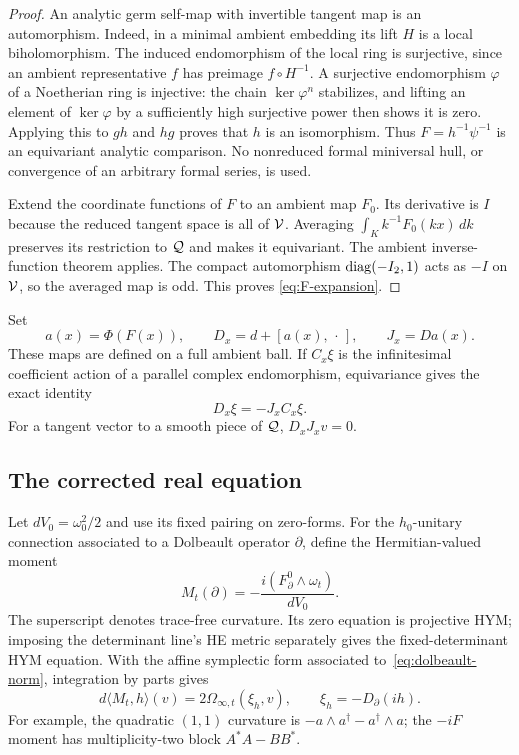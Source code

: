 \begin{proof}
An analytic germ self-map with invertible tangent map is an automorphism.
Indeed, in a minimal ambient embedding its lift $H$ is a local
biholomorphism. The induced endomorphism of the local ring is
surjective, since an ambient representative $f$ has preimage
$f\circ H^{-1}$. A surjective endomorphism $\varphi$ of a Noetherian
ring is injective: the chain $\ker\varphi^n$ stabilizes, and lifting
an element of $\ker\varphi$ by a sufficiently high surjective power
then shows it is zero. Applying this to $gh$ and $hg$ proves that
$h$ is an isomorphism. Thus $F=h^{-1}\psi^{-1}$ is an equivariant
analytic comparison. No nonreduced formal miniversal hull, or
convergence of an arbitrary formal series, is used.

Extend the coordinate functions of $F$ to an ambient map $F_0$.
Its derivative is $I$ because the reduced tangent space is all of
$\mathcal V$. Averaging $\int_K k^{-1}F_0(kx)\,dk$ preserves its restriction
to $\mathcal Q$ and makes it equivariant. The ambient inverse-function
theorem applies. The compact automorphism $\operatorname{diag}(-I_2,1)$ acts as
$-I$ on $\mathcal V$, so the averaged map is odd. This proves
\eqref{eq:F-expansion}.
\end{proof}

Set
\begin{equation}\label{eq:reconstruction}
a(x)=\Phi(F(x)),\qquad D_x=d+[a(x),\,\cdot\,],\qquad J_x=Da(x).
\end{equation}
These maps are defined on a full ambient ball. If $C_x\xi$ is the
infinitesimal coefficient action of a parallel complex endomorphism,
equivariance gives the exact identity
\begin{equation}\label{eq:equivariance}
D_x\xi=-J_xC_x\xi.
\end{equation}
For a tangent vector to a smooth piece of $\mathcal Q$, $D_xJ_xv=0$.

\subsection{The corrected real equation}

Let $dV_0=\omega_0^2/2$ and use its fixed pairing on zero-forms.
For the $h_0$-unitary connection associated to a Dolbeault operator
$\partial$, define the Hermitian-valued moment
\begin{equation}\label{eq:infinite-moment}
M_t(\partial)=-\frac{i(F_\partial^0\wedge\omega_t)}{dV_0}.
\end{equation}
The superscript denotes trace-free curvature. Its zero equation is
projective HYM; imposing the determinant line's HE metric separately
gives the fixed-determinant HYM equation. With the affine symplectic
form associated to~\eqref{eq:dolbeault-norm}, integration by parts gives
\begin{equation}\label{eq:infinite-moment-identity}
d\langle M_t,h\rangle(v)
=2\Omega_{\infty,t}(\xi_h,v),\qquad
\xi_h=-D_\partial(ih).
\end{equation}
For example, the quadratic $(1,1)$ curvature is
$-a\wedge a^\dagger-a^\dagger\wedge a$; the $-iF$ moment has
multiplicity-two block $A^*A-BB^*$.

